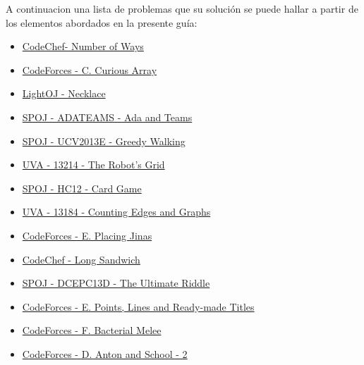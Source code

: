 A continuacion una lista de problemas que su solución se puede hallar a partir de los elementos abordados en la presente guía:

\begin{itemize}
	\item \href{https://www.codechef.com/LTIME24/problems/NWAYS/}{CodeChef- Number of Ways}
	\item \href{https://codeforces.com/problemset/problem/407/C}{CodeForces - C. Curious Array}
	\item \href{https://lightoj.com/problem/necklace}{LightOJ - Necklace}
	\item \href{https://www.spoj.com/problems/ADATEAMS/}{SPOJ - ADATEAMS - Ada and Teams}
	\item \href{https://www.spoj.com/problems/UCV2013E/}{SPOJ - UCV2013E - Greedy Walking}
	\item \href{https://onlinejudge.org/index.php?option=com_onlinejudge&Itemid=8&page=show_problem&problem=5137}{UVA - 13214 - The Robot's Grid}
	\item \href{https://www.spoj.com/problems/HC12/}{SPOJ - HC12 - Card Game}
	\item \href{https://onlinejudge.org/index.php?option=onlinejudge&page=show_problem&problem=5095}{UVA - 13184 - Counting Edges and Graphs}
	\item \href{https://codeforces.com/problemset/problem/1696/E}{CodeForces - E. Placing Jinas}
	\item \href{https://www.codechef.com/MAY17/problems/SANDWICH/}{CodeChef - Long Sandwich}
	\item \href{https://www.spoj.com/problems/DCEPC13D/}{SPOJ - DCEPC13D - The Ultimate Riddle}
	\item \href{https://codeforces.com/contest/872/problem/E}{CodeForces - E. Points, Lines and Ready-made Titles}
	\item \href{https://codeforces.com/contest/760/problem/F}{CodeForces - F. Bacterial Melee}
	\item \href{https://codeforces.com/contest/785/problem/D}{CodeForces - D. Anton and School - 2}
	
\end{itemize}